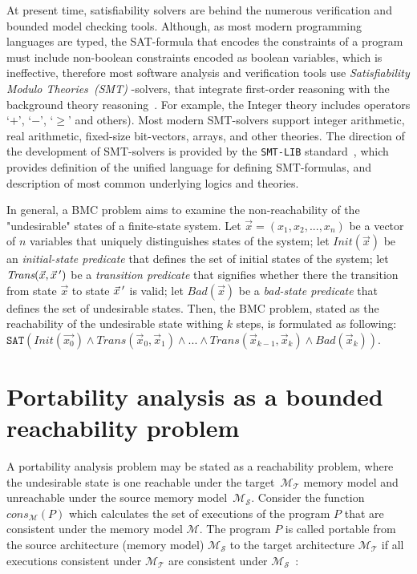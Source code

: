 At present time, satisfiability solvers are behind the numerous verification and bounded model checking tools.
Although, as most modern programming languages are typed, the SAT-formula that encodes the constraints of a program must include non-boolean constraints encoded as boolean variables, which is ineffective, therefore most software analysis and verification tools use \textit{Satisfiability Modulo Theories~(SMT)} -solvers, that integrate first-order reasoning with the background theory reasoning~\cite{kroening2008decision}.
For example, the Integer theory includes operators `$+$', `$-$', `$\geqslant$' and others).
Most modern SMT-solvers support integer arithmetic, real arithmetic, fixed-size bit-vectors, arrays, and other theories.
The direction of the development of SMT-solvers is provided by the \texttt{SMT-LIB} standard~\cite{smt-lib}, which provides definition of the unified language for defining SMT-formulas, and description of most common underlying logics and theories.

In general, a BMC problem aims to examine the non-reachability of the "undesirable" states of a finite-state system.
Let $\vec{x} = (x_1, x_2, ..., x_n)$ be a vector of $n$ variables that uniquely distinguishes states of the system; let $\textit{Init}(\vec{x})$ be an \textit{initial-state predicate} that defines the set of initial states of the system; let $\textit{Trans}(\vec{x}, \vec{x}\,')$ be a \textit{transition predicate} that signifies whether there the transition from state $\vec{x}$ to state $\vec{x}\,'$ is valid; let $\textit{Bad}(\vec{x})$ be a \textit{bad-state predicate} that defines the set of undesirable states.
Then, the BMC problem, stated as the reachability of the undesirable state withing $k$ steps, is formulated as following:
$\texttt{SAT}( \textit{Init}(\vec{x_0}) \land \textit{Trans}(\vec{x}_0, \vec{x}_1) \land ... \land \textit{Trans}(\vec{x}_{k-1}, \vec{x}_k) \land \textit{Bad}(\vec{x}_k) )$.


\section{Portability analysis as a bounded reachability problem}
\label{ch:enc:bmc}

A portability analysis problem may be stated as a reachability problem, where the undesirable state is one reachable under the target~$\mathcal{M_T}$ memory model and unreachable under the source memory model~$\mathcal{M_S}$.
Consider the function $\textit{cons}_{\mathcal{M}}(P)$ which calculates the set of executions of the program $P$ that are consistent under the memory model $\mathcal{M}$.
The program $P$ is called portable from the source architecture (memory model) $\mathcal{M_S}$ to the target architecture $\mathcal{M_T}$ if all executions consistent under $\mathcal{M_T}$ are consistent under $\mathcal{M_S}$~\cite{Porthos17a}:

